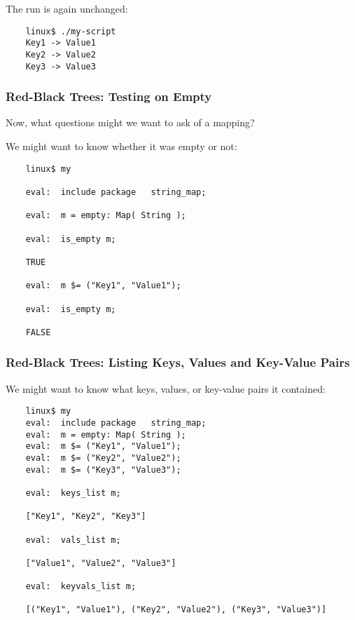 The run is again unchanged:

\begin{verbatim}
    linux$ ./my-script
    Key1 -> Value1
    Key2 -> Value2
    Key3 -> Value3
\end{verbatim}


\cutend*

\subsubsection{Red-Black Trees: Testing on Empty}

Now, what questions might we want to ask of a mapping?

We might want to know whether it was empty or not:

\begin{verbatim}
    linux$ my

    eval:  include package   string_map;

    eval:  m = empty: Map( String );

    eval:  is_empty m;

    TRUE

    eval:  m $= ("Key1", "Value1");

    eval:  is_empty m;

    FALSE
\end{verbatim}


\cutend*

\subsubsection{Red-Black Trees:  Listing Keys, Values and Key-Value Pairs}

We might want to know what keys, values, or key-value pairs it contained: 

\begin{verbatim}
    linux$ my
    eval:  include package   string_map;
    eval:  m = empty: Map( String );
    eval:  m $= ("Key1", "Value1");
    eval:  m $= ("Key2", "Value2");
    eval:  m $= ("Key3", "Value3");

    eval:  keys_list m;

    ["Key1", "Key2", "Key3"]

    eval:  vals_list m;

    ["Value1", "Value2", "Value3"]

    eval:  keyvals_list m;

    [("Key1", "Value1"), ("Key2", "Value2"), ("Key3", "Value3")]
\end{verbatim}

